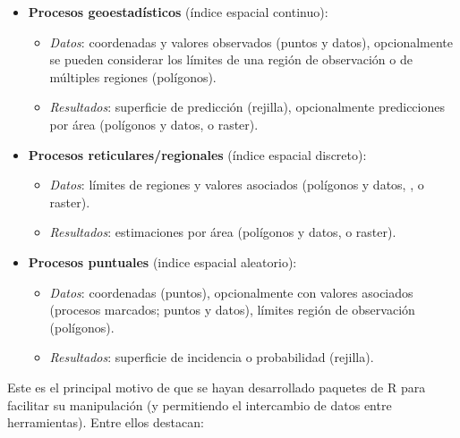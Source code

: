 \documentclass[
  spanish,
]{book}
\theoremstyle{break}
\theoremstyle{definition}
\theoremstyle{definition}
\theoremstyle{definition}
\theoremstyle{definition}
\theoremstyle{remark}
\begin{document}
\begin{itemize}
\item
  \textbf{Procesos geoestadísticos} (índice espacial continuo):

  \begin{itemize}
  \item
    \emph{Datos}: coordenadas y valores observados (puntos y datos), opcionalmente se pueden considerar los límites de una región de observación o de múltiples regiones (polígonos).
  \item
    \emph{Resultados}: superficie de predicción (rejilla),
    opcionalmente predicciones por área (polígonos y datos, o raster).
  \end{itemize}
\item
  \textbf{Procesos reticulares/regionales} (índice espacial discreto):

  \begin{itemize}
  \item
    \emph{Datos}: límites de regiones y valores asociados (polígonos y datos, , o raster).
  \item
    \emph{Resultados}: estimaciones por área (polígonos y datos, o raster).
  \end{itemize}
\item
  \textbf{Procesos puntuales} (indice espacial aleatorio):

  \begin{itemize}
  \item
    \emph{Datos}: coordenadas (puntos), opcionalmente con valores asociados (procesos marcados; puntos y datos),
    límites región de observación (polígonos).
  \item
    \emph{Resultados}: superficie de incidencia o probabilidad (rejilla).
  \end{itemize}
\end{itemize}

Este es el principal motivo de que se hayan desarrollado paquetes de R para facilitar su manipulación (y permitiendo el intercambio de datos entre herramientas).
Entre ellos destacan:
\end{document}
